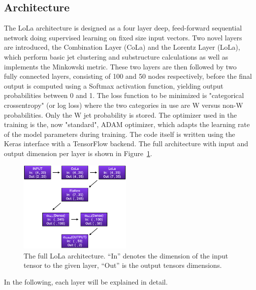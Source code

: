 \subsection{Architecture}
The LoLa architecture is designed as a four layer deep, feed-forward sequential network doing supervised learning on fixed size input vectors.
Two novel layers are introduced, the Combination Layer (CoLa) and the Lorentz Layer (LoLa), which perform basic jet clustering and substructure calculations as well as implements the Minkowski metric.
These two layers are then followed by two fully connected layers, consisting of 100 and 50 nodes respectively, before the final output is computed using a Softmax activation function, yielding output probabilities between 0 and 1. The loss function to be minimized is "categorical crossentropy" (or log loss) where the two categories in use are W versus non-W probabilities. Only the W jet probability is stored.
The optimizer used in the training is the, now "standard", ADAM optimizer, which adapts the learning rate of the model parameters during training. The code itself is written using the Keras interface with a TensorFlow backend.
The full architecture with input and output dimension per layer is shown in Figure~\ref{fig:lola:arch}.
\begin{figure}[h!]
\centering
\includegraphics[width=0.49\textwidth]{figures/vtagging/misc/architecture.png}
\caption{The full LoLa architecture. ``In'' denotes the dimension of the input tensor to the given layer, ``Out'' is the output tensors dimensions.}
\label{fig:lola:arch}
\end{figure}
In the following, each layer will be explained in detail.

